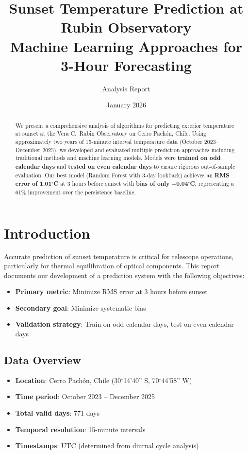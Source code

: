 \documentclass[11pt,letterpaper]{article}
\title{Sunset Temperature Prediction at Rubin Observatory\\
\large Machine Learning Approaches for 3-Hour Forecasting}
\author{Analysis Report}
\date{January 2026}
\begin{document}
\maketitle

\begin{abstract}
We present a comprehensive analysis of algorithms for predicting exterior temperature at sunset at the Vera C.\ Rubin Observatory on Cerro Pach\'on, Chile. Using approximately two years of 15-minute interval temperature data (October 2023--December 2025), we developed and evaluated multiple prediction approaches including traditional methods and machine learning models. Models were \textbf{trained on odd calendar days} and \textbf{tested on even calendar days} to ensure rigorous out-of-sample evaluation. Our best model (Random Forest with 3-day lookback) achieves an \textbf{RMS error of 1.01$^\circ$C} at 3 hours before sunset with \textbf{bias of only $-$0.04$^\circ$C}, representing a 61\% improvement over the persistence baseline.
\end{abstract}

\section{Introduction}

Accurate prediction of sunset temperature is critical for telescope operations, particularly for thermal equilibration of optical components. This report documents our development of a prediction system with the following objectives:
\begin{itemize}[noitemsep]
    \item \textbf{Primary metric}: Minimize RMS error at 3 hours before sunset
    \item \textbf{Secondary goal}: Minimize systematic bias
    \item \textbf{Validation strategy}: Train on odd calendar days, test on even calendar days
\end{itemize}

\subsection{Data Overview}
\begin{itemize}[noitemsep]
    \item \textbf{Location}: Cerro Pach\'on, Chile (30$^\circ$14'40'' S, 70$^\circ$44'58'' W)
    \item \textbf{Time period}: October 2023 -- December 2025
    \item \textbf{Total valid days}: 771 days
    \item \textbf{Temporal resolution}: 15-minute intervals
    \item \textbf{Timestamps}: UTC (determined from diurnal cycle analysis)
\end{itemize}
\end{document}
